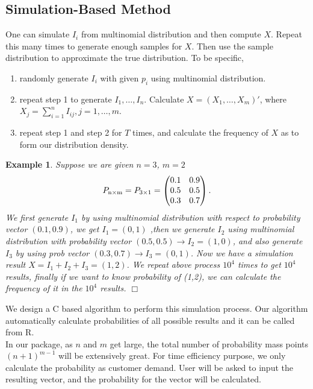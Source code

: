 \documentclass[12pt]{article}
\newcommand{\qedw}{\hfill \ensuremath{\Box}}
\newtheorem{example}{Example}
\begin{document}
\subsection{Simulation-Based Method}
One can simulate $I_i$ from multinomial distribution and then compute $X$. Repeat this many times to generate enough samples for $X$. Then use the sample distribution to approximate the true distribution.
To be specific,
\begin{enumerate}[Step 1]
    \item randomly generate $I_i$ with given $p_i$ using multinomial distribution.
    \item repeat step 1 to generate $I_1,\dots,I_n$. Calculate $X = (X_1,\dots,X_{m})'$, where $X_j = \sum_{i=1}^{n}I_{ij}, j=1,\dots,m$.
    \item repeat step 1 and step 2 for $T$ times, and calculate the frequency of $X$ as to form our distribution density.
\end{enumerate}
\begin{example}\normalfont
Suppose we are given $n=3$, $m=2$
\begin{equation*}
P_{\rm n \times m} = P_{3 \times 1} = \begin{pmatrix}
0.1 & 0.9\\
0.5 & 0.5\\
0.3 & 0.7\\
\end{pmatrix}.
\end{equation*}
We first generate $I_1$ by using multinomial distribution with respect to probability vector $(0.1,0.9)$, we get $I_1 = (0,1)$  ,then we generate $I_2$ using multinomial distribution with probability vector $(0.5,0.5) \rightarrow I_2 = (1,0)$, and also generate $I_3$ by using prob vector $(0.3,0.7) \rightarrow I_3 = (0,1)$. Now we have a simulation result $X = I_1+I_2+I_3 = (1,2)$. We repeat above process $10^4$ times to get $10^4$ results, finally if we want to know probability of (1,2), we can calculate the frequency of it in the $10^4$ results. \qedw
\end{example}
We design a C based algorithm to perform this simulation process. Our algorithm automatically calculate probabilities of all possible results and it can be called from R.\\

In our package, as $n$ and $m$ get large, the total number of probability mass points $(n+1)^{m-1}$ will be extensively great. For time efficiency purpose, we only calculate the probability as customer demand. User will be asked to input the resulting vector, and the probability for the vector will be calculated.
\end{document}

